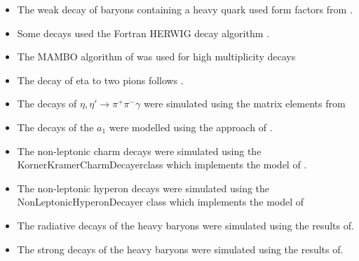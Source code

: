 \documentclass{article}
\begin{document}
\begin{itemize}
\item The weak decay of baryons containing a heavy quark used form factors from \cite{Cheng:1995fe,Cheng:1996cs}.
\item Some decays used the Fortran HERWIG decay algorithm \cite{Corcella:2000bw}.
\item The MAMBO algorithm of \cite{Kleiss:1991rn} was used for high multiplicity decays
\item The decay of eta to two pions follows \cite{Beisert:2003zs,Gormley:1970qz,Tippens:2001fm}.
\item The decays of $\eta,\eta'\to\pi^+\pi^-\gamma$ were simulated using the matrix elements from \cite{Venugopal:1998fq,Holstein:2001bt}
\item The decays of the $a_1$ were modelled using the approach of \cite{Kuhn:1990ad}.

\item The non-leptonic charm decays were simulated using the KornerKramerCharmDecayerclass which implements the model of \cite{Korner:1992wi}.
\item The non-leptonic hyperon decays were simulated using the NonLeptonicHyperonDecayer class which implements the model of\cite{Borasoy:1999md}
\item The radiative decays of the heavy baryons were simulated using the results of\cite{Ivanov:1999bk,Ivanov:1998wj}.
\item The strong decays of the heavy baryons were simulated using the results of\cite{Ivanov:1999bk}.
\end{itemize}
\end{document}
